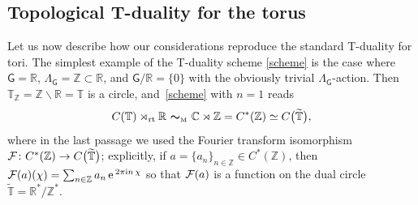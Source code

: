 \documentclass[pdftex]{sigma}
\numberwithin{equation}{section}
\newcommand{\mbf}[1]{{\boldsymbol {#1} }}
\def\ii{{{\rm i}}}
\newcommand{\sfG}{\mathsf{G}}
\newcommand{\rt}{{\rm rt}}
\newcommand{\complex}{{\mathbb C}} %
\newcommand{\zed}{{\mathbb Z}} %
\newcommand{\real}{{\mathbb R}} %
\newcommand{\torus}{{\mathbb T}} %
\def\e{{\,\rm e}\,}
\begin{document}
\subsection{Topological T-duality for the torus}\label{sec:toruscrossedprod}

Let us now describe how our considerations reproduce the standard
T-duality for tori.
The simplest example of the T-duality scheme \eqref{scheme} is the case where $\sfG
=\real$, $\Lambda_\sfG =\zed\subset\real$, and $\sfG/\real=\{0\}$ with the obviously trivial $\Lambda_\sfG$-action. Then
$\torus_\zed= \zed\backslash\real=\torus$ is a circle, and~\eqref{scheme} with $n=1$ reads
\[
C(\torus)\rtimes_\rt \real \ \mbf\sim_{\text{\tiny M}} \ \complex\rtimes \zed
 = C^*(\zed) \simeq C\big(\widetilde\torus\big) ,
\]
where in the last passage we used the Fourier transform isomorphism
${\cal F}\colon C^*(\zed)\to C\big(\widetilde\torus\big)$; explicitly,
if $a=\{a_{n}\}_{n\in \zed}\in C^*(\zed)$, then
${\cal F}(a)(\chi)=\sum_{n\in \zed} a_{n} \e^{2\pi\ii n\,\chi}$ so that
 ${\cal F}(a)$ is a function on the
dual circle $\widetilde\torus=\real^*/\zed^*$.
\end{document}
